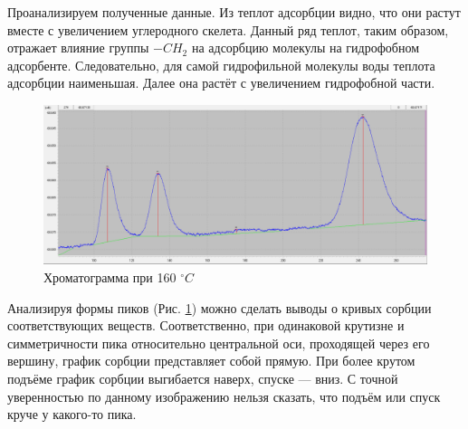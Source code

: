 \documentclass{article}
\begin{document}
Проанализируем полученные данные. Из теплот адсорбции видно, что они растут вместе с увеличением углеродного скелета. Данный ряд теплот, таким образом, отражает влияние группы $-CH_2$ на адсорбцию молекулы на гидрофобном адсорбенте. Следовательно, для самой гидрофильной молекулы воды теплота адсорбции наименьшая. Далее она растёт с увеличением гидрофобной части.





    \begin{figure}[h!]
    \centering
    \includegraphics[width=0.75\linewidth]{Images/Снимок экрана 2024-10-13 235735.png}
    \caption{Хроматограмма при 160 $^{\circ}C$ }
    \label{fig:Рис 2}
    \end{figure}

Анализируя формы пиков (Рис. \ref{fig:Рис 2}) можно сделать выводы о кривых сорбции соответствующих веществ. Соответственно, при одинаковой крутизне и симметричности пика относительно центральной оси, проходящей через его вершину, график сорбции представляет собой прямую. При более крутом подъёме график сорбции выгибается наверх, спуске — вниз. С точной уверенностью по данному изображению нельзя сказать, что подъём или спуск круче у какого-то пика.
\end{document}
